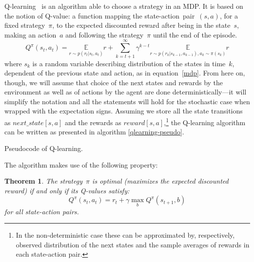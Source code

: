 Q-learning~\cite{qlearning, qlearning-old} is an algorithm able to choose a strategy in an MDP. It is based on the notion of Q-value: a function mapping the state-action~pair~$(s, a)$, for a fixed strategy~$\pi$, to the expected discounted reward after being in the state~$s$, making an action~$a$ and following the strategy~$\pi$ until the end of the episode.
\begin{equation}\label{q-value}
  Q^\pi(s_t, a_t) = \underset{r\sim p(r_t | s_t, a_t)}{\mathbb{E}} r + \sum_{k=t+1}^\infty \gamma^{k-t}\underset{r\sim p(r_k|s_{k-1}, a_{k-1}), a_k\sim \pi(s_k)}{\mathbb{E}} r
\end{equation}
where $s_k$ is a random variable describing distribution of the states in time~$k$, dependent of the previous state and action, as in equation~\eqref{mdp}. From here on, though, we will assume that choice of the next states and rewards by the environment as well as of actions by the agent are done deterministically---it will simplify the notation and all the statements will hold for the stochastic case when wrapped with the expectation signs. Assuming we store all the state transitions as $next\_state[s, a]$ and the rewards as $reward[s, a]$,\footnote{In the non-deterministic case these can be approximated by, respectively, observed distribution of the next states and the sample averages of rewards in each state-action pair.} the Q-learning algorithm can be written as presented in algorithm \ref{qlearning-pseudo}.

\begin{algorithm} \label{qlearning-pseudo}
  \caption{Pseudocode of Q-learning.}
\end{algorithm}

The algorithm makes use of the following property:

\theoremstyle{theorem}
\newtheorem{theorem}{Theorem}
\begin{theorem}\label{qlearning-theorem}
The strategy~$\pi$ is optimal (maximizes the expected discounted reward) if and only if its Q-values satisfy:
\begin{equation}\label{qlearning-property}
  Q^\pi(s_t, a_t) = r_t + \gamma \max_b Q^\pi(s_{t+1}, b)
\end{equation}
for all state-action pairs.
\end{theorem}

